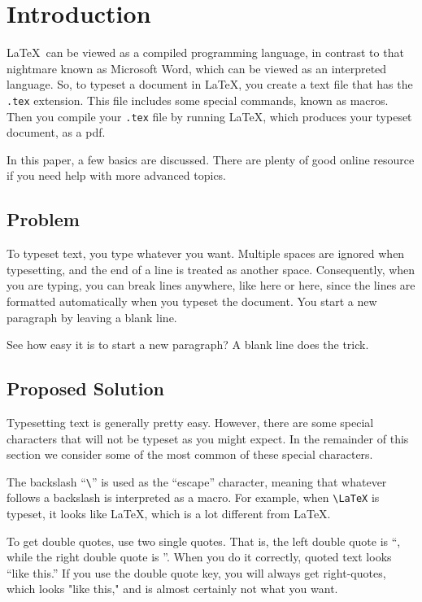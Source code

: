 \chapter{Introduction}

\LaTeX\ can be viewed
as a compiled programming language, in contrast to that 
nightmare known as Microsoft Word,
which can be viewed as an interpreted language. So, to typeset a
document in \LaTeX, you create a text file that has the {\tt .tex} extension.
This file includes some special
commands, known as macros. Then
you compile your {\tt .tex} file by running  \LaTeX,
which produces your typeset document, as a pdf. 

In this paper, a few basics are discussed. There are plenty of good online resource
if you need help with more advanced topics.


\section{Problem} 

To typeset text, you type whatever you want. Multiple spaces are
ignored                           when typesetting, and
the end of a line is treated as another space.
Consequently, when you are typing, you can break lines anywhere, like here
or here,
since the lines are formatted automatically when you typeset the document.
You start a new paragraph by leaving a blank line.

See how easy it is to start a new paragraph? A blank line does the trick.


\section{Proposed Solution}

Typesetting text is generally pretty easy. However, there are some special
characters that will not be typeset as you might expect. In the remainder of this
section we consider some of the most common of these
special characters. 

The backslash ``\verb+\+'' is used 
as the ``escape'' character, meaning that
whatever follows a backslash is interpreted as a macro.
For example, when \verb+\LaTeX+ is typeset, it looks like \LaTeX, which 
is a lot different from LaTeX.

To get double quotes, use two single quotes. That is, the left double quote is ``, while the right double
quote is ''. When you do it correctly, quoted text looks ``like this.''
If you use the double quote key, you will always get right-quotes, which looks "like this," and is
almost certainly not what you want.

